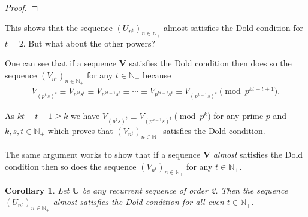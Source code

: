 \documentclass[preprint,12pt]{elsarticle}
\newcommand{\N}{\mathbb{N}}
\newtheorem{corollary}{Corollary}[theorem]
\begin{document}
\begin{proof}
\end{proof}

This shows that the sequence $({U}_{n^{t}})_{n\in\N_+}$ almost  satisfies the Dold condition for $t=2$. But what about the other powers?

One can see that if a sequence $\mathbf{V}$ satisfies the Dold condition then does so the sequence $({V}_{n^t})_{n\in\N_+}$ for any $t\in\N_+$ because
\begin{align}
    {V}_{(p^ks)^t} \equiv 
    {V}_{p^{kt}s^t} \equiv
    {V}_{p^{kt-1}s^t} \equiv
    \cdots \equiv
    {V}_{p^{kt-t}s^t} \equiv
    {V}_{(p^{k-1}s)^t}
    \pmod {p^{kt-t+1}}.
\end{align}

As $kt-t+1 \geqslant k$ we have ${V}_{(p^ks)^t}\equiv {V}_{(p^{k-1}s)^t} \pmod{p^k}$ for any prime $p$ and $k,s, t \in \N_+$ which proves that $({V}_{n^t})_{n\in\N_+}$ satisfies the Dold condition. 

The same argument works to show that if a sequence $\mathbf{V}$ \textit{almost}
satisfies the Dold condition then so does the sequence $({V}_{n^t})_{n\in\N_+}$ for any $t\in \N_+$.

\begin{corollary}\label{theor_n2_final}
    Let $\mathbf{U}$ be any recurrent sequence of order 2. Then the sequence $(U_{n^{t}})_{n\in\N_+}$ almost satisfies the Dold condition for all even $t\in\N_+$.
\end{corollary}
\end{document}
